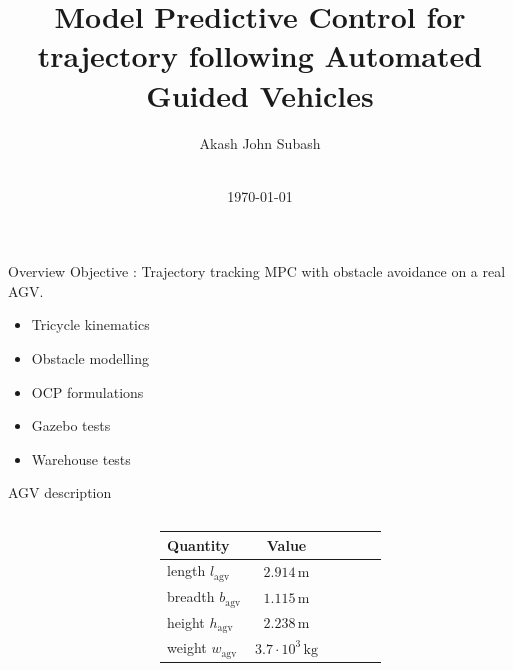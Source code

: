 \documentclass[10pt,aspectratio=1610]{beamer} %
\title[Model Predictive Control for trajectory following Automated Guided Vehicles]{\large Model Predictive Control for trajectory following Automated Guided Vehicles}
\author[\large Akash John Subash]{\large Akash John Subash}
\institute{\large Systems Control and Optimization \& ek robotics}
\date[\today]{\\ \today }
\begin{document}
\InsertTitle


\begin{frame}{Overview}
	\large{Objective : Trajectory tracking MPC with obstacle avoidance on a real AGV.}
	\hfill \break
	\begin{itemize}[label=\textbullet]\large
		\item Tricycle kinematics
		\item Obstacle modelling
		\item OCP formulations
		\item Gazebo tests
		\item Warehouse tests
	\end{itemize}
\end{frame}


\begin{frame}{AGV description}
\begin{columns}[onlytextwidth]
	\begin{column}{0.5\textwidth}
			\begin{center}
			\def\svgwidth{1\textwidth}
			
			\end{center}
	\end{column}
	\begin{column}{0.5\textwidth}
		\begin{table}[h!tbp]
			\small
			\begin{center}
				\begin{tabular}{lccccl}\toprule
					\textbf{Quantity} & \textbf{Value}\\
					\midrule
					length $l_{\mathrm{agv}}$ & $\mathrm{2.914\,m}$\\
					breadth $b_{\mathrm{agv}}$ & $\mathrm{1.115\,m}$\\
					height $h_{\mathrm{agv}}$ & $\mathrm{2.238\,m}$\\
					weight $w_{\mathrm{agv}}$ & $\mathrm{3.7\cdot10^{3}\,kg}$\\
					\bottomrule
				\end{tabular}
			\end{center}
		\end{table}
	\end{column}
\end{columns}
\end{frame}
\end{document}
